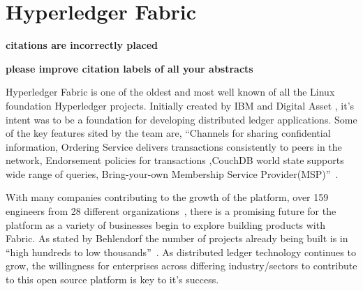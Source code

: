 \section{Hyperledger Fabric}

{\bf citations are incorrectly placed}

{\bf please improve citation labels of all your abstracts}

Hyperledger Fabric is one of the oldest and most well known of all the
Linux foundation Hyperledger projects. Initially created by IBM and
Digital Asset , it's intent was to be a foundation for developing
distributed ledger applications. Some of the key features sited by the
team are, ``Channels for sharing confidential information, Ordering
Service delivers transactions consistently to peers in the network,
Endorsement policies for transactions ,CouchDB world state supports
wide range of queries, Bring-your-own Membership Service
Provider(MSP)''~\cite{Hyperledger Fabric}.

With many companies contributing to the growth of the platform, over
159 engineers from 28 different organizations~\cite{Behlendorf
  Interview}, there is a promising future for the platform as a
variety of businesses begin to explore building products with
Fabric. As stated by Behlendorf the number of projects already being
built is in 
``high hundreds to low thousands''~\cite{Behlendorf Interview}. 
As distributed ledger technology continues to grow, the
willingness for enterprises across differing industry/sectors to
contribute to this open source platform is key to it's success.

